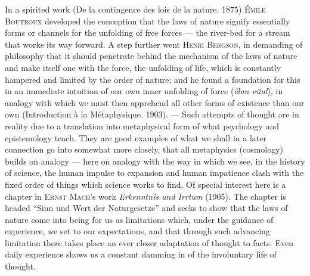 \documentclass[12pt]{book}
\newcommand{\opage}[1]{\marginnote{\footnotesize\textit{[#1]}}}
\begin{document}
In a spirited work (De la contingence des lois de la nature. 1875)
\textsc{Émile Boutroux} developed the conception that the laws of nature signify
essentially forms or channels for the unfolding of free forces --- the river-bed
for a stream that works its way forward. A step further went \textsc{Henri
Bergson}, in demanding of philosophy that it should penetrate behind the
mechanism of the laws of nature and make itself one with the force, the
unfolding of life, which is constantly hampered and limited by the order of
nature; and he found a foundation for this in an immediate intuition of our own
inner unfolding of force (\textit{élan vital}), in analogy with which we must
then apprehend all other forms of existence than our own (Introduction à la
Métaphysique. 1903). --- Such attempts of thought are in reality due to a
translation into metaphysical form of what psychology and epistemology teach.
They are good examples of what we shall in a later connection go into somewhat
more closely, that all metaphysics (cosmology) builds on analogy --- here on
analogy with the way in which we see, in the history of science, the human
impulse to expansion and human impatience clash with the fixed order of things
which science works to find. Of special interest here is a chapter in
\textsc{Ernst Mach}'s work \textit{Erkenntnis und Irrtum} (1905). The chapter is
headed ``Sinn und Wert der Naturgesetze'' and seeks to show that the laws of
nature come into being for us as limitations which, under the guidance of
experience, \opage{48}we set to our expectations, and that through such advancing
limitation there takes place an ever closer adaptation of thought to facts. Even
daily experience shows us a constant damming in of the involuntary life of
thought.
\end{document}
